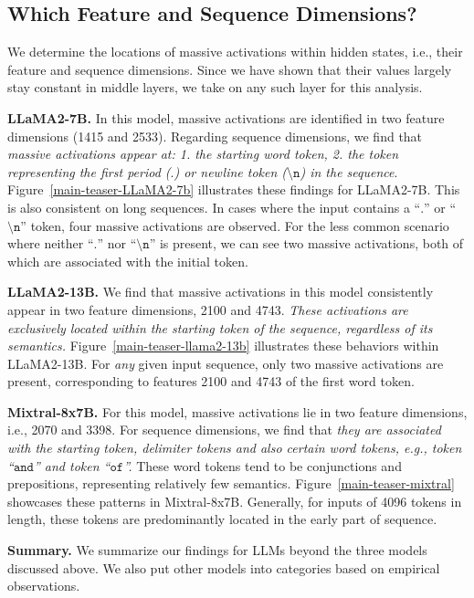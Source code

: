 \subsection{Which Feature and Sequence Dimensions?}\label{sec-coordinate}
We determine the locations of massive activations within hidden states, i.e., their feature and sequence dimensions. Since we have shown that their values largely stay constant in middle layers, we take on any such layer for this analysis. 

\textbf{LLaMA2-7B.} In this model, massive activations are identified in two feature dimensions (1415 and 2533). Regarding sequence dimensions, we find that \textit{massive activations appear at: 1. the starting word token, 2. the token representing the first period ($\texttt{.}$) or newline token ($\texttt{\textbackslash n}$) in the sequence}. Figure~\ref{main-teaser-LLaMA2-7b} illustrates these findings for LLaMA2-7B. This is also consistent on long sequences. In cases where the input contains a ``$\texttt{.}$'' or ``$\texttt{\textbackslash n}$'' token, four massive activations are observed. For the less common scenario where neither ``$\texttt{.}$'' nor ``$\texttt{\textbackslash n}$'' is present, we can see two massive activations, both of which are associated with the initial token. 

\textbf{LLaMA2-13B.} We find that massive activations in this model consistently appear in two feature dimensions, 2100 and 4743. \textit{These activations are exclusively located within the starting token of the sequence, regardless of its semantics.} Figure~\ref{main-teaser-llama2-13b} illustrates these behaviors within LLaMA2-13B. For \textit{any} given input sequence, only two massive activations are present, corresponding to features 2100 and 4743 of the first word token.

\textbf{Mixtral-8x7B.} For this model, massive activations lie in two feature dimensions, i.e., 2070 and 3398. For sequence dimensions, we find that \textit{they are associated with the starting token, delimiter tokens and also certain word tokens, e.g., token ``$\texttt{and}$'' and token ``$\texttt{of}$''.}  These word tokens tend to be conjunctions and prepositions, representing relatively few semantics. Figure~\ref{main-teaser-mixtral} showcases these patterns in Mixtral-8x7B. Generally, for inputs of 4096 tokens in length, these tokens are predominantly located in the early part of sequence.

\textbf{Summary.} We summarize our findings for LLMs beyond the three models discussed above. We also put other models into categories based on empirical observations.

